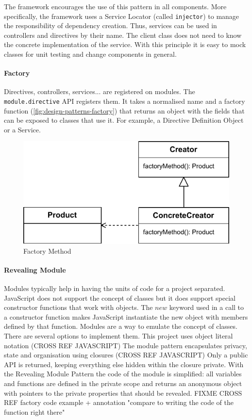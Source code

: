 The framework encourages the use of this pattern in all components. 
More specifically, the framework uses a Service Locator  (called \texttt{injector}) to manage the responsibility of dependency creation.
Thus, services can be used in controllers and directives by their name.
The client class does not need to know the concrete implementation of the service. 
With this principle it is easy to mock classes for unit testing and change components in general.


\paragraph{Factory} Directives, controllers, services... are registered on modules. 
The \texttt{module.directive} \ac{API} registers them. 
It takes a normalised name and a factory function (\ref{fig:design-patterns-factory}) that returns an object with the fields that can be exposed to classes that use it.
For example, a Directive Definition Object or a Service.

\begin{figure}[htb]
    \centering
    \includegraphics{figures/design-patterns-factory.pdf}
    \caption{Factory Method}
    \label{fig:design-patterns-factory0}
\end{figure}


\paragraph{Revealing Module} \cite{Osmani:2012} Modules typically help in having the units of code for a project separated.
JavaScript does not support the concept of classes but it does support special constructor functions that work with objects. 
The $new$ keyword used in a call to a constructor function makes JavaScript instantiate the new object with members defined by that function.
Modules are a way to emulate the concept of classes.
There are several options to implement them. 
This project uses object literal notation (CROSS REF JAVASCRIPT)
The module pattern encapsulates privacy, state and organisation using closures (CROSS REF JAVASCRIPT)
Only a public \ac{API} is returned, keeping everything else hidden within the closure private.
With the Revealing Module Pattern the code of the module is simplified: all variables and functions are defined in the private scope and returns an anonymous object with pointers to the private properties that should be revealed.
FIXME CROSS REF factory code example  + annotation "compare to writing the code of the function right there"

